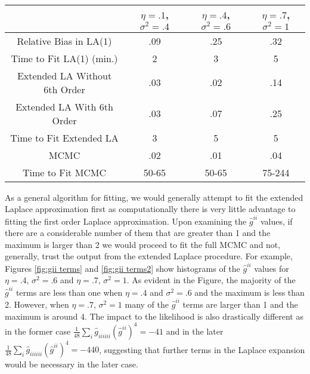 \documentclass[11pt]{isuthesis}
\begin{document}
	\begin{table}[h]
		\begin{center}
			\begin{tabular}{ |c|c|c|c| } 
				\hline
				& $\eta=.1$, $\sigma^2=.4$&$\eta=.4$, $\sigma^2=.6$& $\eta=.7$, $\sigma^2=1$\\
				\hline
				Relative Bias in LA(1) & .09 & .25 & .32\\ 
				Time to Fit LA(1) (min.)& 2 & 3 & 5\\
				\hline
				Extended LA Without 6th Order & .03 & .02 & .14\\
				Extended LA With 6th Order& .03 & .07 & .25\\
				Time to Fit Extended LA & 3 & 5 &  5\\
				\hline
				MCMC & .02 & .01 & .04\\
				Time to Fit MCMC  & 50-65 & 50-65 & 75-244\\
				\hline
			\end{tabular}
		\end{center}
		\label{Simulations}
	\end{table}
	  As a general algorithm for fitting, we would generally attempt to fit the extended Laplace approximation first as computationally there is very little advantage to fitting the first order Laplace approximation.  Upon examining the $\hat{g}^{ii}$ values, if there are a considerable number of them that are greater than 1 and the maximum is larger than 2 we would proceed to fit the full MCMC and not, generally, trust the output from the extended Laplace procedure.  For example, Figures \ref{fig:gii terms} and \ref{fig:gii terms2} show histograms of the $\hat{g}^{ii}$ values for $\eta=.4$, $\sigma^2=.6$ and $\eta=.7$, $\sigma^2=1$.  As evident in the Figure, the majority of the $\hat{g}^{ii}$ terms are less than one when $\eta=.4$ and $\sigma^2=.6$ and the maximum is less than 2.  However, when $\eta=.7$, $\sigma^2=1$  many of the $\hat{g}^{ii}$ terms are larger than 1  and the maximum is around 4.  The impact to the likelihood is also drastically different as in the former case $\frac{1}{48}\sum_{i}\hat{g}_{iiiiii}(\hat{g}^{ii})^4=-41$ and in the later $\frac{1}{48}\sum_{i}\hat{g}_{iiiiii}(\hat{g}^{ii})^4=-440$, suggesting that further terms in the Laplace expansion would be necessary in the later case.
	
\end{document}

